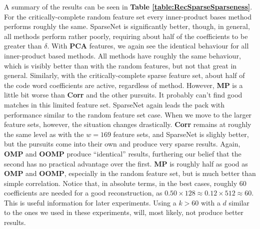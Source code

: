 \documentclass[12pt,a4paper,oneside,english]{UPBThesis}
\newcommand{\hctimes}[2]{{#1}\!\times\!{#2}}
\begin{document}
A summary of the results can be seen in \textbf{Table \ref{table:RecSparseSparseness}}. For the critically-complete random feature set every inner-product bases method performs roughly the same. SparseNet is significantly better, though, in general, all methods perform rather poorly, requiring about half of the coefficients to be greater than $\delta$. With \textbf{PCA} features, we again see the identical behaviour for all inner-product based methods. All methods have roughly the same behaviour, which is visibly better than with the random features, but not that great in general. Similarly, with the critically-complete sparse feature set, about half of the code word coefficients are active, regardless of method. However, \textbf{MP} is a little bit worse than \textbf{Corr} and the other pursuits. It probably can't find good matches in this limited feature set. SparseNet again leads the pack with performance similar to the random feature set case. When we move to the larger feature sets, however, the situation changes drastically. \textbf{Corr} remains at roughly the same level as with the $w=169$ feature sets, and SparseNet is slighly better, but the pursuits come into their own and produce very sparse results. Again, \textbf{OMP} and \textbf{OOMP} produce ``identical'' results, furthering our belief that the second has no practical advantage over the first. \textbf{MP} is roughly half as good as \textbf{OMP} and \textbf{OOMP}, especially in the random feature set, but is much better than simple correlation. Notice that, in absolute terms, in the best cases, roughly $60$ coefficients are needed for a good reconstruction, as $\hctimes{0.50}{128} \approx \hctimes{0.12}{512} \approx 60$. This is useful information for later experiments. Using a $k > 60$ with a $d$ similar to the ones we used in these experiments, will, most likely, not produce better results.
\end{document}
